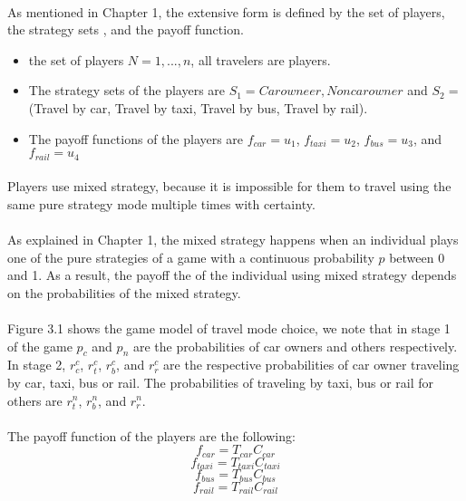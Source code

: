 \paragraph{} As mentioned in Chapter 1, the extensive form is defined by the set of players, the strategy sets , and the payoff function.
\begin{itemize}
\item the set of players $N = {1,...,n}$, all travelers are players.
\item The strategy sets of the players are $S_1 = {Car owneer, Noncar owner}$ and $ S_2 = $(Travel by car, Travel by taxi, Travel by bus, Travel by rail).
\item The payoff functions of the players are $f_{car} = u_1$, $f_{taxi} = u_2$, $f_{bus} = u_3$, and $f_{rail} = u_4$
\end{itemize}
\paragraph{}Players use mixed strategy, because it is impossible for them to travel using the same pure strategy mode multiple times with certainty.
\paragraph{}As explained in Chapter 1, the mixed strategy happens when an individual plays one of the pure strategies of a game with a continuous probability $p$ between 0 and 1. As a result, the payoff the of the individual using mixed strategy depends on the probabilities of the mixed strategy.
\paragraph{}Figure 3.1 shows the game model of travel mode choice, we note that in stage 1 of the game $p_c$ and $p_n$ are the probabilities of car owners and others respectively. In stage 2, $r^c_{c}$, $r^{c}_{t}$, $r^c_{b}$, and $r^c_{r}$ are the respective probabilities of car owner traveling by car, taxi, bus or rail. The probabilities of traveling by taxi, bus or rail for others are $r^n_{t}$, $r^n_{b}$, and $r^n_{r}$.
\paragraph{}The payoff function of the players are the following: 
\begin{equation}
f_{car} = T_{car} C_{car}
\end{equation}
\begin{equation}
f_{taxi} = T_{taxi} C_{taxi}
\end{equation}
\begin{equation}
f_{bus} = T_{bus} C_{bus}
\end{equation}
\begin{equation}
f_{rail} = T_{rail} C_{rail}
\end{equation}
